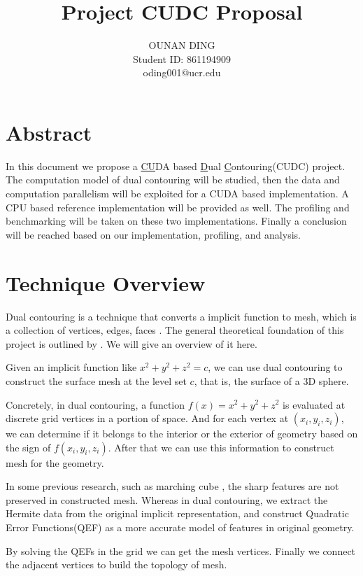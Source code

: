\documentclass[a4paper,12pt]{article}
\title{Project CUDC Proposal}
\date{}
\author{
OUNAN DING\\
Student ID: 861194909\\
oding001@ucr.edu
}
\begin{document}
\maketitle{}

\tableofcontents{}

\section{Abstract}

In this document we propose a
\underline{CU}DA based \underline{D}ual \underline{C}ontouring(CUDC)
project.
The computation model of dual contouring will be studied,
then the data and computation parallelism will be exploited
for a CUDA based implementation.
A CPU based reference implementation will be provided as well.
The profiling and benchmarking will be taken on these two implementations.
Finally a conclusion
will be reached based on our implementation, profiling, and analysis.

\section{Technique Overview}
Dual contouring is a technique that converts
a implicit function \cite{ wiki:implicit-function}
to mesh,
which is a collection of vertices, edges, faces \cite{wiki:polygon-mesh}.
The general theoretical foundation of this project
is outlined by \cite{ju2002dual}. We will give an overview of it here.

Given an implicit function like $x^2 + y^2 + z^2 = c$,
we can use dual contouring to construct the surface mesh
at the level set $c$, that is, the surface of a 3D sphere.

Concretely, in dual contouring,
a function $f(x) = x^2 + y^2 + z^2$ is evaluated at discrete grid vertices
in a portion of space.
And for each vertex at $(x_i, y_i, z_i)$, we can determine if it belongs to
the interior or the exterior of geometry
based on the sign of $f(x_i, y_i, z_i)$.
After that we can use this information to construct mesh for the geometry.

In some previous research, such as marching cube \cite{lorensen1987marching},
the sharp features are not preserved in constructed mesh.
Whereas in dual contouring, we extract the Hermite data
from the original implicit representation,
and construct Quadratic Error Functions(QEF)
as a more accurate model of features in original geometry.

By solving the QEFs in the grid we can get the mesh vertices.
Finally we connect the adjacent vertices to build the topology of mesh.
\end{document}
